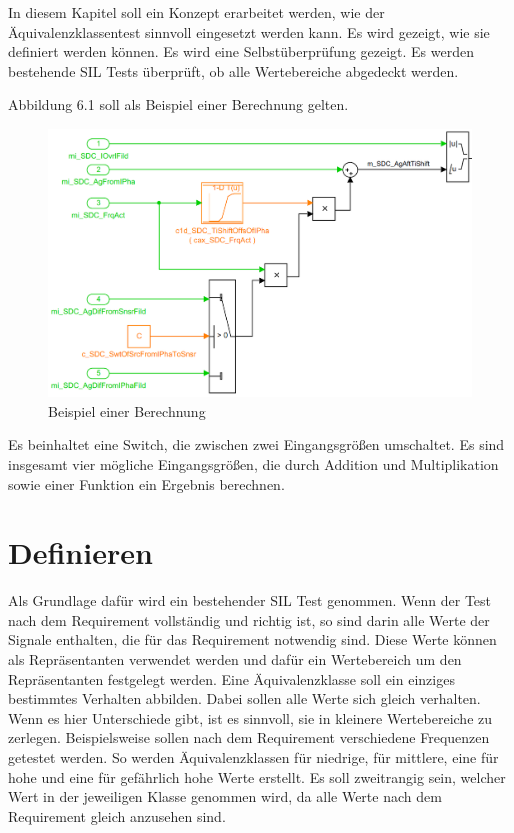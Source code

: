 In diesem Kapitel soll ein Konzept erarbeitet werden, wie der Äquivalenzklassentest sinnvoll eingesetzt werden kann.
Es wird gezeigt, wie sie definiert werden können. Es wird eine Selbstüberprüfung gezeigt. 
Es werden bestehende SIL Tests überprüft, ob alle Wertebereiche abgedeckt werden.

Abbildung 6.1 soll als Beispiel einer Berechnung gelten.
\begin{figure}[h]
\centering
\includegraphics[scale=.9,]{Bilder/SDCDoku.png}
\caption{Beispiel einer Berechnung}
\end{figure}
Es beinhaltet eine Switch, die zwischen zwei Eingangsgrößen umschaltet. Es sind insgesamt
vier mögliche Eingangsgrößen, die durch Addition und Multiplikation sowie einer Funktion ein Ergebnis berechnen.
\section*{Definieren}
Als Grundlage dafür wird ein bestehender SIL Test genommen. Wenn der Test nach dem Requirement 
vollständig und richtig ist, so sind darin alle Werte der Signale enthalten, die für das Requirement notwendig sind.
Diese Werte können als Repräsentanten verwendet werden und dafür ein Wertebereich um den Repräsentanten
festgelegt werden. Eine Äquivalenzklasse soll ein einziges bestimmtes Verhalten abbilden. Dabei sollen alle Werte sich gleich verhalten. 
Wenn es hier Unterschiede gibt, ist es sinnvoll, sie in kleinere Wertebereiche zu zerlegen.
Beispielsweise sollen nach dem Requirement verschiedene Frequenzen getestet werden.
So werden Äquivalenzklassen
für niedrige, für mittlere, eine für hohe und eine für gefährlich hohe Werte erstellt. Es soll zweitrangig sein,
welcher Wert in der jeweiligen Klasse genommen wird, da alle Werte nach dem Requirement gleich anzusehen sind. 
